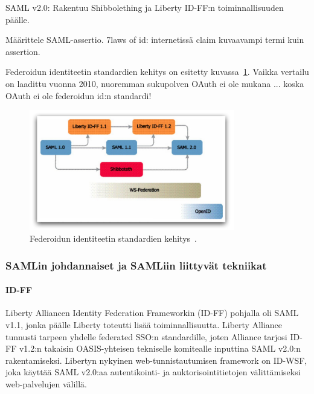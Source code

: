 \documentclass[finnish,gradu]{tktltiki}
\begin{document}

  SAML v2.0: Rakentuu Shibbolething ja Liberty ID-FF:n toiminnallisuuden päälle.

  Määrittele SAML-assertio. 7laws of id: internetissä claim kuvaavampi termi kuin assertion.


  Federoidun identiteetin standardien kehitys on esitetty kuvassa~\ref{fig:federoidun_id_standardien_kehitys}. Vaikka vertailu on laadittu vuonna 2010, nuoremman sukupolven OAuth ei ole mukana ... koska OAuth ei ole federoidun id:n standardi!

  \begin{figure}
    \centering
    \includegraphics[width=0.8\textwidth]{images/federoidun_id_standardien_kehitys.jpg}
    \caption{Federoidun identiteetin standardien kehitys~\cite{ping_identity_primer_federated_id_2010}.}
    \label{fig:federoidun_id_standardien_kehitys}
  \end{figure}


  \subsubsection{SAMLin johdannaiset ja SAMLiin liittyvät tekniikat} %
  \label{ssub:samlin_johdannaiset}


  \paragraph{ID-FF} %
  \label{par:id_ff}
  Liberty Alliancen Identity Federation Frameworkin (ID-FF) pohjalla oli SAML v1.1, jonka päälle Liberty toteutti lisää toiminnallisuutta.
  Liberty Alliance tunnusti tarpeen yhdelle federated SSO:n standardille, joten Alliance tarjosi ID-FF v1.2:n takaisin OASIS-yhteisen tekniselle komitealle inputtina SAML v2.0:n rakentamiseksi.
  Libertyn nykyinen web-tunnistautumisen framework on ID-WSF, joka käyttää SAML v2.0:aa autentikointi- ja auktorisointitietojen välittämiseksi web-palvelujen välillä.
\end{document}
